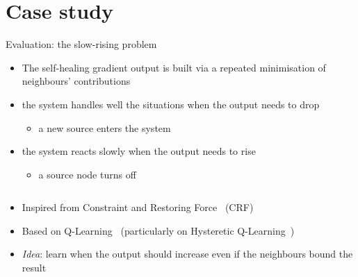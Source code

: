 \documentclass[9pt, aspectratio=169, handout]{beamer}
\begin{document}
\section{Case study}
\begin{frame}{Evaluation: the slow-rising problem}
  \begin{card}
    \begin{itemize}
      \item The self-healing gradient output is built via a repeated minimisation of neighbours' contributions
      \item[\success{\faThumbsUp}] the system handles well the situations when the output needs to drop
      \begin{itemize}
        \item a new source enters the system
      \end{itemize}
      \item[\failure{\faThumbsDown}] the system reacts slowly when the output needs to rise
      \begin{itemize}
        \item a source node turns off
      \end{itemize}
    \end{itemize}
  \end{card}
  \begin{columns}
    \begin{column}{0.26\textwidth}
    \end{column}
    \begin{column}{0.26\textwidth}
    \end{column}
    \begin{column}{0.26\textwidth}
    \end{column}
  \end{columns}
  \begin{card}
    \begin{itemize}
      \item Inspired from Constraint and Restoring Force~\cite{DBLP:conf/sac/BealBVT08} (CRF)
      \item Based on Q-Learning~\cite{DBLP:journals/ml/WatkinsD92} (particularly on Hysteretic Q-Learning~\cite{DBLP:conf/iros/MatignonLF07})
      \item \emph{Idea}: learn when the output should increase even if the neighbours bound the result

\end{itemize}
\end{card}
\end{frame}
\end{document}
